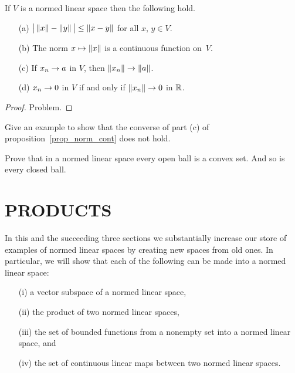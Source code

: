 \begin{prop}\label{prop_norm_cont}  If $V$ is a normed linear space then the following hold.
 \begin{enumerate}
  \item[(a)] $\bigl|\,\lVert x\rVert - \lVert y\rVert \,\bigr| \le \lVert x - y\rVert$ for all $x$, $y \in V$.
  \item[(b)] The norm $x \mapsto \lVert x\rVert$ is a continuous function on~$V$.
  \item[(c)] If $x_n \rightarrow a$ in $V$, then $\lVert x_n\rVert \rightarrow \lVert a\rVert$.
  \item[(d)] $x_n \rightarrow 0$ in $V$ if and only if $\lVert x_n\rVert \rightarrow 0$ in $\mathbb{R}$.
 \end{enumerate}
\end{prop}

\begin{proof} Problem.  \ns  \end{proof}

\begin{prob} Give an example to show that the converse of part (c) of
proposition~\ref{prop_norm_cont} does not hold.
\end{prob}

\begin{prob}\label{prob_ball_conv}  Prove that in a normed linear space every open ball is a convex
set.  And so is every closed ball.
\end{prob}










\section{PRODUCTS}\label{sec_prod_nls}
In this and the succeeding three sections we substantially increase our store of examples of
normed linear spaces by creating new spaces from old ones.  In particular, we will show that
each of the following can be made into a normed linear space:
 \begin{enumerate}
  \item[(i)] a vector subspace of a normed linear space,
  \item[(ii)] the product of two normed linear spaces,
  \item[(iii)] the set of bounded functions from a nonempty set into
a normed linear space, and
  \item[(iv)] the set of continuous linear maps between two normed
linear spaces.
 \end{enumerate}

